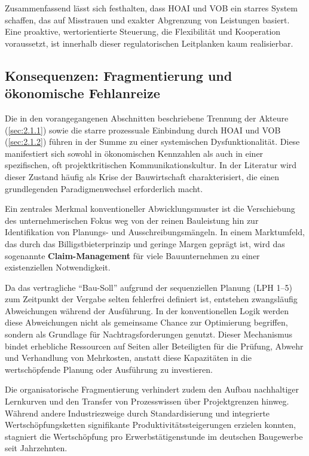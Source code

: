 Zusammenfassend lässt sich festhalten, dass \acs{HOAI} und \acs{VOB} ein starres System schaffen, das auf Misstrauen und exakter Abgrenzung von Leistungen basiert. Eine proaktive, wertorientierte Steuerung, die Flexibilität und Kooperation voraussetzt, ist innerhalb dieser regulatorischen Leitplanken kaum realisierbar.

\subsection{Konsequenzen: Fragmentierung und ökonomische Fehlanreize}
\label{sec:2.1.3}

Die in den vorangegangenen Abschnitten beschriebene Trennung der Akteure (\cref{sec:2.1.1}) sowie die starre prozessuale Einbindung durch \acs{HOAI} und \acs{VOB} (\cref{sec:2.1.2}) führen in der Summe zu einer systemischen Dysfunktionalität. Diese manifestiert sich sowohl in ökonomischen Kennzahlen als auch in einer spezifischen, oft projektkritischen Kommunikationskultur. In der Literatur wird dieser Zustand häufig als Krise der Bauwirtschaft charakterisiert, die einen grundlegenden Paradigmenwechsel erforderlich macht. \autocite[Vgl.][S.~7 ff]{latham_constructing_1994}\, \autocite[Vgl.][S.~42--44]{habib_alternative_2020}

Ein zentrales Merkmal konventioneller Abwicklungsmuster ist die Verschiebung des unternehmerischen Fokus weg von der reinen Bauleistung hin zur Identifikation von Planungs- und Ausschreibungsmängeln. In einem Marktumfeld, das durch das Billigstbieterprinzip und geringe Margen geprägt ist, wird das sogenannte \textbf{Claim-Management} für viele Bauunternehmen zu einer existenziellen Notwendigkeit. \autocite[Vgl.][S.~203 ff]{girmscheid_projektabwicklung_2016}

Da das vertragliche \enquote{Bau-Soll} aufgrund der sequenziellen Planung (\acs{LPH} 1--5) zum Zeitpunkt der Vergabe selten fehlerfrei definiert ist, entstehen zwangsläufig Abweichungen während der Ausführung. In der konventionellen Logik werden diese Abweichungen nicht als gemeinsame Chance zur Optimierung begriffen, sondern als Grundlage für Nachtragsforderungen genutzt. Dieser Mechanismus bindet erhebliche Ressourcen auf Seiten aller Beteiligten für die Prüfung, Abwehr und Verhandlung von Mehrkosten, anstatt diese Kapazitäten in die wertschöpfende Planung oder Ausführung zu investieren. \autocite[Vgl.][S.~234 ff]{love_forensic_2008}

Die organisatorische Fragmentierung verhindert zudem den Aufbau nachhaltiger Lernkurven und den Transfer von Prozesswissen über Projektgrenzen hinweg. Während andere Industriezweige durch Standardisierung und integrierte Wertschöpfungsketten signifikante Produktivitätssteigerungen erzielen konnten, stagniert die Wertschöpfung pro Erwerbstätigenstunde im deutschen Baugewerbe seit Jahrzehnten.\autocite[Vgl.][S.~7 f]{bmvi_abschlussbericht_2015}

